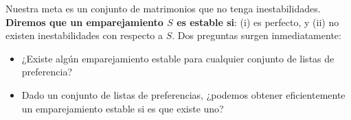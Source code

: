 \documentclass[a4paper, 12pt]{book}
\begin{document}
Nuestra meta es un conjunto de matrimonios que no tenga inestabilidades. \textbf{Diremos que un emparejamiento $S$ es estable si}: (i) es perfecto, y (ii) no existen inestabilidades con respecto a $S$. Dos preguntas surgen inmediatamente:

\begin{itemize}
    \item ¿Existe algún emparejamiento estable para cualquier conjunto de listas de preferencia?
    \item Dado un conjunto de listas de preferencias, ¿podemos obtener eficientemente un emparejamiento estable si es que existe uno? 
\end{itemize}


\end{document}
